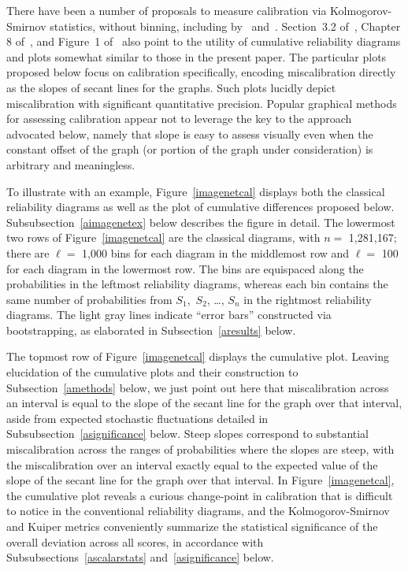 \documentclass{article}
\begin{document}
There have been a number of proposals to measure calibration
via Kolmogorov-Smirnov statistics, without binning, including
by~\cite{gupta-rahimi-ajanthan-mensink-sminchisescu-hartley} and~\cite{tygert}.
Section~3.2 of~\cite{gneiting-balabdaoui-raftery},
Chapter 8 of~\cite{wilks}, and Figure~1
of~\cite{gupta-rahimi-ajanthan-mensink-sminchisescu-hartley}
also point to the utility of cumulative reliability diagrams and plots
somewhat similar to those in the present paper.
The particular plots proposed below focus on calibration specifically,
encoding miscalibration directly as the slopes of secant lines for the graphs.
Such plots lucidly depict miscalibration
with significant quantitative precision.
Popular graphical methods for assessing calibration appear not to leverage
the key to the approach advocated below, namely that slope is easy to assess
visually even when the constant offset of the graph (or portion of the graph
under consideration) is arbitrary and meaningless.

To illustrate with an example,
Figure~\ref{imagenetcal} displays both the classical reliability diagrams
as well as the plot of cumulative differences proposed below.
Subsubsection~\ref{aimagenetex} below describes the figure in detail.
The lowermost two rows of Figure~\ref{imagenetcal} are the classical diagrams,
with $n =$ 1,281,167;
there are $\ell =$ 1,000 bins for each diagram in the middlemost row
and $\ell =$ 100 for each diagram in the lowermost row.
The bins are equispaced along the probabilities
in the leftmost reliability diagrams,
whereas each bin contains the same number of probabilities
from $S_1$,~$S_2$, \dots, $S_n$ in the rightmost reliability diagrams.
The light gray lines indicate ``error bars'' constructed via bootstrapping,
as elaborated in Subsection~\ref{aresults} below.

The topmost row of Figure~\ref{imagenetcal} displays the cumulative plot.
Leaving elucidation of the cumulative plots and their construction
to Subsection~\ref{amethods} below,
we just point out here that miscalibration across an interval
is equal to the slope of the secant line for the graph over that interval,
aside from expected stochastic fluctuations
detailed in Subsubsection~\ref{asignificance} below.
Steep slopes correspond to substantial miscalibration across the ranges
of probabilities where the slopes are steep, with the miscalibration
over an interval exactly equal to the expected value of the slope
of the secant line for the graph over that interval.
In Figure~\ref{imagenetcal},
the cumulative plot reveals a curious change-point in calibration
that is difficult to notice in the conventional reliability diagrams,
and the Kolmogorov-Smirnov and Kuiper metrics conveniently summarize
the statistical significance of the overall deviation across all scores,
in accordance
with Subsubsections~\ref{ascalarstats} and~\ref{asignificance} below.
\end{document}
